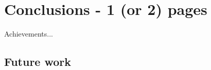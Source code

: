 \documentclass[12pt,a4paper]{article}
\begin{document}
\section{Conclusions - 1 (or 2) pages}
Achievements...

\subsection{Future work}








\end{document}
